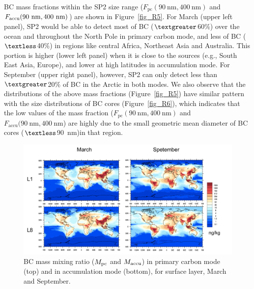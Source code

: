 \documentclass[12pt, fullpage]{uiucthesis2009}
\begin{document}
	BC mass fractions within the SP2 size range ($F_{\text{pc}}(90~\text{nm}, 400~\text{nm})$ and
	$F_{\text{accu}}(90~\rm nm, 400~\rm nm)$) are shown in Figure~\ref{fig_R5}. For March
	(upper left panel), SP2 would be able to detect most of BC ($\textgreater$60$\%$) over the ocean and throughout the North Pole in primary carbon mode, and less of BC ($\textless$40$\%$) in regions like central Africa, Northeast Asia and Australia. This portion is higher (lower left panel) when it is close to the sources (e.g., South East Asia, Europe), and lower at high latitudes in accumulation mode. For September
	(upper right panel), however, SP2 can only detect less than $\textgreater$20$\%$ of BC in the Arctic in both modes. We also observe that the distributions of the above mass fractions (Figure~\ref{fig_R5}) have similar pattern with the size distributions of BC cores (Figure~\ref{fig_R6}), which indicates that the low values of the mass fraction ($F_{\text{pc}}(90~\text{nm}, 400~\text{nm})$ and $F_{\text{accu}}(90~\text{nm}, 400~\text{nm}$) are highly due to the small geometric mean diameter of BC cores ($\textless$90~nm)in that region.
	\begin{figure}[h] 
		\begin{center}
			\includegraphics[width = 1\textwidth]{Rplot01}
			\caption[BC mass mixing ratio ($M_{\rm pc}$ and $M_{\rm accu}$) in primary carbon mode (top) and in accumulation mode (bottom), for surface layer, March and September]{\label{fig_R4}BC mass mixing ratio ($M_{\rm pc}$ and $M_{\rm accu}$) in primary carbon mode (top) and in accumulation mode (bottom), for surface layer, March and September.}
		\end{center}
	\end{figure}
	
\end{document}
